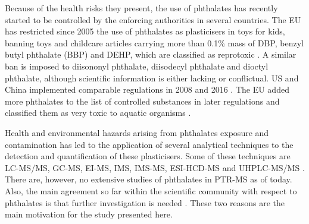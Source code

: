 %

Because of the health risks they present, the use of phthalates has recently started to be controlled by the enforcing authorities in several countries. The EU has restricted since 2005 the use of phthalates as plasticisers in toys for kids, banning toys and childcare articles carrying more than  0.1\% mass of DBP, %
benzyl butyl phthalate (BBP)  and DEHP, which are classified as reprotoxic  
\cite{Parliament2005}. 
A similar ban is imposed to diisononyl phthalate, diisodecyl phthalate and dioctyl phthalate, although scientific information is either lacking or conflictual.
US and China  implemented comparable regulations in 2008  and 2016 \cite{USban,chinaGB6675}.
%
The EU added more phthalates to the list of controlled substances in later regulations and classified them as very toxic to aquatic organisms \cite{Parliament2008}.


%
%
Health and environmental hazards arising from phthalates exposure and contamination has led to the application of several analytical techniques to the detection and quantification  of these plasticisers.
%
Some of these techniques are
LC-MS/MS, %
GC-MS,  %
EI-MS, %
IMS, IMS-MS, %
ESI-HCD-MS %
and
UHPLC-MS/MS %
 \cite{xu2014determination,net2015reliable,GC-PICI-phthalates,lacko2018dissociation,mzcloudd,michalczuk2019isomer,fan2012determination}.
%
%
%
%
%
There are, however, no extensive studies of phthalates in PTR-MS as of today.
%
Also, the main agreement so far within the scientific community with respect to phthalates is that further investigation is needed \cite{hauser2005phthalates}.
%
These two reasons are the main motivation for the study presented here. 



